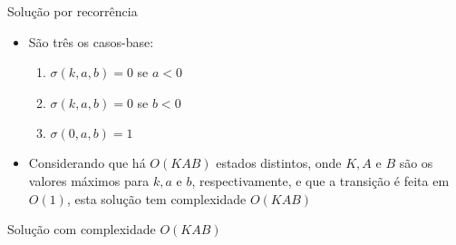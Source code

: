 \begin{frame}[fragile]{Solução por recorrência}

    \begin{itemize}
        \item São três os casos-base:
        \begin{enumerate}
            \item $\sigma(k, a, b) = 0$ se $a < 0$
            \item $\sigma(k, a, b) = 0$ se $b < 0$
            \item $\sigma(0, a, b) = 1$
        \end{enumerate}

        \item Considerando que há $O(KAB)$ estados distintos, onde $K, A$ e $B$ são os valores
            máximos para $k, a$ e $b$, respectivamente, e que a transição é feita em $O(1)$, esta
            solução tem complexidade $O(KAB)$
    \end{itemize}

\end{frame}

\begin{frame}[fragile]{Solução com complexidade $O(KAB)$}
\end{frame}
